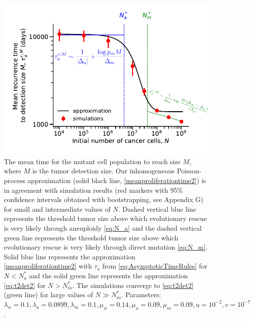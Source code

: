 \documentclass[12pt]{extarticle}
\begin{document}
\begin{figure}
\vspace*{1\baselineskip}
\includegraphics[width=1\textwidth]{Figures/RecurrencePlot.pdf}
\caption{The mean time for the mutant cell population to reach size $M$, where $M$ is the tumor detection size.
Our inhomogeneous Poisson-process approximation (solid black line, \cref{meanproliferationtime2}) is in agreement with simulation results (red markers with 95\% confidence intervals obtained with bootstrapping, see Appendix G) for small and intermediate values of $N$. Dashed vertical blue line represents the threshold tumor size above which evolutionary rescue is very likely through aneuploidy \cref{eq:N_a} and the dashed vertical green line represents the threshold tumor size above which evolutionary rescue is very likely through direct mutation \cref{eq:N_m}. Solid blue line represents the approximation \cref{meanproliferationtime2} with $\tau_a$ from \cref{eq:AsymptoticTimeRules} for $N<N_a^*$ and the solid green line  represents the approximation \cref{eq:t2det2} for $N>N_m^*$. The simulations converge to \cref{eq:t2det2} (green line) for large values of $N\gg N_m^*$.  Parameters: $\lambda_w=0.1,\lambda_a=0.0899,\lambda_m=0.1,\mu_w=0.14,\mu_a=0.09,\mu_m=0.09, u=10^{-2}, v=10^{-7}$.}
\label{RecurrencePlot}
\end{figure}
\end{document}
